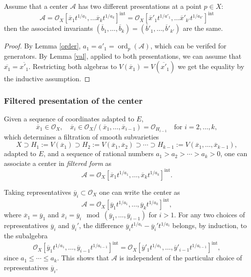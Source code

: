 \documentclass{amsart}
\newcommand{\cA}{{\mathcal A}}
\newcommand{\cO}{{\mathcal O}}
\newcommand{\ord}{{\operatorname{ord}}}
\newcommand{\inte}{{\operatorname{int}}}
\begin{document}
\begin{corollary} \cite{ATW-weighted}  Assume that a  center $\cA$ has two different presentations at a point $p\in X$:
$$\cA=\cO_X[\overline{x}_1 t^{1/a_1},\ldots\overline{x}_kt^{1/a_k}]^{\inte}=\cO_X[\overline{x}'_1 t^{1/a'_1},\ldots\overline{x}'_{k'}t^{1/a_{k'}}]^{\inte} $$ 
then the associated invariants $(\overline{b}_1,\ldots,\overline{b}_k)=(\overline{b}'_1,\ldots,\overline{b}'_{k'})$ are the same.
	\end{corollary}
\begin{proof}  By Lemma \ref{order}, 
$a_1=a'_1=\ord_p(\cA)$, which can be verifed for generators.
By Lemma \ref{val}, applied to both  presentations, we can assume that $\overline{x_1}=\overline{x'_1}$.
Restricting  both algebras to $V(\overline{x}_1)=V(\overline{x'}_1)$ we get the equality by the inductive  assumption.
	\end{proof}
\subsubsection{Filtered presentation of the center} \label{filter}
Given a sequence of coordinates adapted to $E$,
\[
\overline{x}_1 \in \mathcal{O}_X, \quad \overline{x}_i \in \mathcal{O}_X / (\overline{x}_1, \ldots, \overline{x}_{i-1})=\cO_{H_{i-1}} \quad \text{for } i = 2, \ldots, k,
\]
which determines a filtration of smooth subvarieties
\[
X \supset H_1 := V(\overline{x}_1) \supset H_2 := V(\overline{x}_1, \overline{x}_2) \supset \cdots \supset H_{k-1} := V(\overline{x}_1, \ldots, \overline{x}_{k-1}),
\]
adapted to $E$, and  a sequence of rational numbers $a_1 > a_2 > \cdots > a_k > 0$, one can associate a center in {\it filtered form} as
\[
\mathcal{A} = \mathcal{O}_X[\overline{x}_1 t^{1/a_1}, \ldots, \overline{x}_k t^{1/a_k}]^{\mathrm{int}}.
\]

Taking representatives $\overline{y}_i\subset \cO_X$ one can write the center as
\[
\mathcal{A} = \mathcal{O}_X[\overline{y}_1 t^{1/a_1}, \ldots, \overline{y}_k t^{1/a_k}]^{\mathrm{int}},
\]
where $\overline{x}_1 = \overline{y}_1$ and $\overline{x}_i = \overline{y}_i \mod (\overline{y}_1, \ldots, \overline{y}_{i-1})$ for $i > 1$. 
 For any two choices of representatives \( \overline{y}_i \) and \( \overline{y}_i' \), the difference
$
\overline{y}_i t^{1/a_i} - \overline{y}_i' t^{1/a_i}
$
belongs, by induction, to the subalgebra 
$$
\mathcal{O}_X[\overline{y}_1 t^{1/a_1}, \ldots, \overline{y}_{i-1} t^{1/a_{i-1}}]^{\mathrm{int}}=\mathcal{O}_X[\overline{y}'_1 t^{1/a_1}, \ldots, \overline{y}'_{i-1} t^{1/a_{i-1}}]^{\mathrm{int}},
$$
since \( a_1 \leq \cdots \leq a_k \).  
This shows that \( \mathcal{A} \) is independent of the particular choice of representatives \( \overline{y}_i \).
\end{document}
